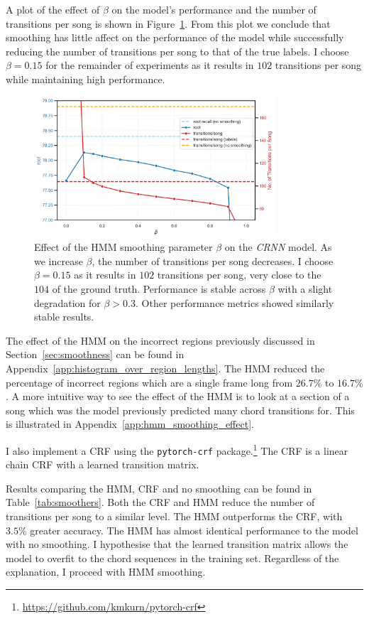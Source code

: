 A plot of the effect of $\beta$ on the model's performance and the number of transitions per song is shown in Figure~\ref{fig:hmm_beta_search}. From this plot we conclude that smoothing has little affect on the performance of the model while successfully reducing the number of transitions per song to that of the true labels. I choose $\beta = 0.15$ for the remainder of experiments as it results in $102$ transitions per song while maintaining high performance. 

\begin{figure}[ht]
    \centering
    \includegraphics[width=0.8\textwidth]{figures/hmm_beta_vs_root_transitions.png}
    \caption{Effect of the HMM smoothing parameter $\beta$ on the \emph{CRNN} model. As we increase $\beta$, the number of transitions per song decreases. I choose $\beta = 0.15$ as it results in $102$ transitions per song, very close to the $104$ of the ground truth. Performance is stable across $\beta$ with a slight degradation for $\beta > 0.3$. Other performance metrics showed similarly stable results. }\label{fig:hmm_beta_search}
\end{figure}

The effect of the HMM on the incorrect regions previously discussed in Section~\ref{sec:smoothness} can be found in Appendix~\ref{app:histogram_over_region_lengths}. The HMM reduced the percentage of incorrect regions which are a single frame long from $26.7\%$ to $16.7\%$. A more intuitive way to see the effect of the HMM is to look at a section of a song which was the model previously predicted many chord transitions for. This is illustrated in Appendix~\ref{app:hmm_smoothing_effect}.

I also implement a CRF using the \texttt{pytorch-crf} package.\footnote{\url{https://github.com/kmkurn/pytorch-crf}} The CRF is a linear chain CRF with a learned transition matrix.

Results comparing the HMM, CRF and no smoothing can be found in Table~\ref{tab:smoothers}. Both the CRF and HMM reduce the number of transitions per song to a similar level. The HMM outperforms the CRF, with $3.5\%$ greater accuracy. The HMM has almost identical performance to the model with no smoothing. I hypothesise that the learned transition matrix allows the model to overfit to the chord sequences in the training set. Regardless of the explanation, I proceed with HMM smoothing.

